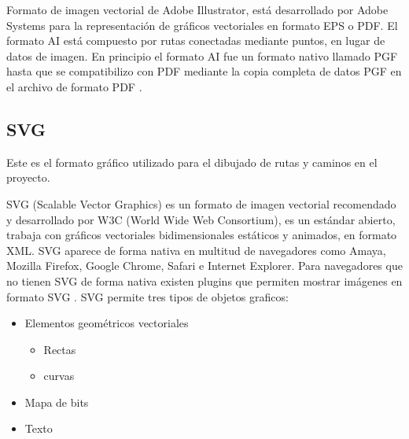 Formato de imagen vectorial de Adobe Illustrator, está desarrollado por Adobe Systems para la representación de gráficos vectoriales en formato EPS o PDF. El formato AI está compuesto por rutas conectadas mediante puntos, en lugar de datos de imagen. 
En principio el formato AI fue un formato nativo llamado PGF hasta que se compatibilizo con PDF mediante la copia completa de datos PGF en el archivo de formato PDF \cite{extensionai}.




\subsection{SVG}\label{svg}

\begin{flushleft}
Este es el formato gráfico utilizado para el dibujado de rutas y caminos en el proyecto.
\end{flushleft}

SVG (Scalable Vector Graphics) es un formato de imagen vectorial recomendado y desarrollado por W3C (World Wide Web Consortium), es un estándar abierto, trabaja con gráficos vectoriales bidimensionales estáticos y animados, en formato XML.
SVG aparece de forma nativa en multitud de navegadores como Amaya, Mozilla Firefox, Google Chrome, Safari e Internet Explorer. Para navegadores que no tienen SVG de forma nativa existen plugins que permiten mostrar imágenes en formato SVG \cite{scalablevec} \cite{lassoformatos}.
SVG permite tres tipos de objetos graficos:




\begin{itemize}
\item 
	Elementos geométricos vectoriales



\begin{itemize}
\item 
	Rectas 



\item 
	curvas
\end{itemize}


\item 
	Mapa de bits



\item 
	Texto



\end{itemize}


